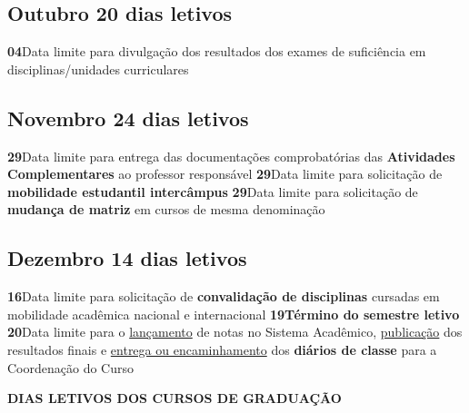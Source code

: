 \documentclass[thesis]{hmcposter}
\begin{document}
\begin{poster}
\subsection{Outubro \hfill 20 dias letivos}\textbf{04}\qquad Data limite para divulgação dos resultados dos exames de suficiência em disciplinas/unidades curriculares \newline \null\subsection{Novembro \hfill 24 dias letivos}\textbf{29}\qquad Data limite para entrega das documentações comprobatórias das \textbf{Atividades Complementares} ao professor responsável \newline \null\textbf{29}\qquad Data limite para solicitação de \textbf{mobilidade estudantil intercâmpus} \newline \null\textbf{29}\qquad Data limite para solicitação de \textbf{mudança de matriz} em cursos de mesma denominação \newline \null\subsection{Dezembro \hfill 14 dias letivos}\textbf{16}\qquad Data limite para solicitação de \textbf{convalidação de disciplinas} cursadas em mobilidade acadêmica nacional e internacional \newline \null\textbf{19}\qquad \textbf{Término do semestre letivo} \newline \null\textbf{20}\qquad Data limite para o \underline{lançamento} de notas no Sistema Acadêmico, \underline{publicação} dos resultados finais e \underline{entrega ou encaminhamento} dos \textbf{diários de classe} para a Coordenação do Curso \newline \null\newpage
~
\vfill
\begin{center}
\large \textbf{DIAS LETIVOS DOS CURSOS DE GRADUAÇÃO}
\newline
\null
\newline
\begin{table}
\centering
{}
\end{table}
\end{center}
\end{poster}
\end{document}
